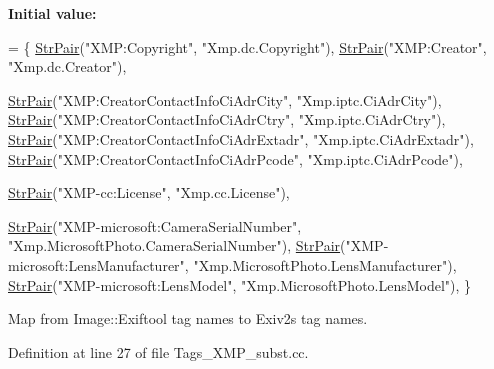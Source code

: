 {\bfseries Initial value\+:}
\begin{DoxyCode}
= \{
    \hyperlink{_tags_8hh_a19c06ce5d6cdc9b5a13fd3eae3dfa411}{StrPair}(\textcolor{stringliteral}{"XMP:Copyright"},                             \textcolor{stringliteral}{"Xmp.dc.Copyright"}), 
    \hyperlink{_tags_8hh_a19c06ce5d6cdc9b5a13fd3eae3dfa411}{StrPair}(\textcolor{stringliteral}{"XMP:Creator"},                               \textcolor{stringliteral}{"Xmp.dc.Creator"}),

    \hyperlink{_tags_8hh_a19c06ce5d6cdc9b5a13fd3eae3dfa411}{StrPair}(\textcolor{stringliteral}{"XMP:CreatorContactInfoCiAdrCity"},           \textcolor{stringliteral}{"Xmp.iptc.CiAdrCity"}),
    \hyperlink{_tags_8hh_a19c06ce5d6cdc9b5a13fd3eae3dfa411}{StrPair}(\textcolor{stringliteral}{"XMP:CreatorContactInfoCiAdrCtry"},           \textcolor{stringliteral}{"Xmp.iptc.CiAdrCtry"}),
    \hyperlink{_tags_8hh_a19c06ce5d6cdc9b5a13fd3eae3dfa411}{StrPair}(\textcolor{stringliteral}{"XMP:CreatorContactInfoCiAdrExtadr"}, \textcolor{stringliteral}{"Xmp.iptc.CiAdrExtadr"}),
    \hyperlink{_tags_8hh_a19c06ce5d6cdc9b5a13fd3eae3dfa411}{StrPair}(\textcolor{stringliteral}{"XMP:CreatorContactInfoCiAdrPcode"},          \textcolor{stringliteral}{"Xmp.iptc.CiAdrPcode"}),

    \hyperlink{_tags_8hh_a19c06ce5d6cdc9b5a13fd3eae3dfa411}{StrPair}(\textcolor{stringliteral}{"XMP-cc:License"},                            \textcolor{stringliteral}{"Xmp.cc.License"}), 

    \hyperlink{_tags_8hh_a19c06ce5d6cdc9b5a13fd3eae3dfa411}{StrPair}(\textcolor{stringliteral}{"XMP-microsoft:CameraSerialNumber"},          \textcolor{stringliteral}{"Xmp.MicrosoftPhoto.CameraSerialNumber"}),
    \hyperlink{_tags_8hh_a19c06ce5d6cdc9b5a13fd3eae3dfa411}{StrPair}(\textcolor{stringliteral}{"XMP-microsoft:LensManufacturer"},            \textcolor{stringliteral}{"Xmp.MicrosoftPhoto.LensManufacturer"}),
    \hyperlink{_tags_8hh_a19c06ce5d6cdc9b5a13fd3eae3dfa411}{StrPair}(\textcolor{stringliteral}{"XMP-microsoft:LensModel"},                   \textcolor{stringliteral}{"Xmp.MicrosoftPhoto.LensModel"}),
  \}
\end{DoxyCode}


Map from Image\+::\+Exiftool tag names to Exiv2\textquotesingle{}s tag names. 



Definition at line 27 of file Tags\+\_\+\+X\+M\+P\+\_\+subst.\+cc.


